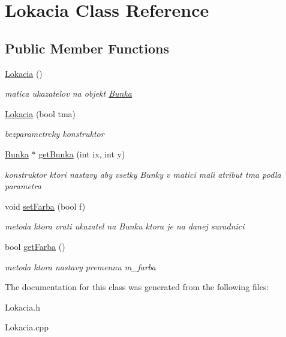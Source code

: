 \hypertarget{class_lokacia}{\section{Lokacia Class Reference}
\label{class_lokacia}
}
\subsection*{Public Member Functions}
\begin{DoxyCompactItemize}
\item 
\hypertarget{class_lokacia_a771d3fb6735a5c35ae151ab62a3b498e}{\hyperlink{class_lokacia_a771d3fb6735a5c35ae151ab62a3b498e}{Lokacia} ()}\label{class_lokacia_a771d3fb6735a5c35ae151ab62a3b498e}

\begin{DoxyCompactList}\small\item\em matica ukazatelov na objekt \hyperlink{class_bunka}{Bunka} \end{DoxyCompactList}\item 
\hypertarget{class_lokacia_ae866508f0db869cb14caf73a051215c3}{\hyperlink{class_lokacia_ae866508f0db869cb14caf73a051215c3}{Lokacia} (bool tma)}\label{class_lokacia_ae866508f0db869cb14caf73a051215c3}

\begin{DoxyCompactList}\small\item\em bezparametrcky konstruktor \end{DoxyCompactList}\item 
\hypertarget{class_lokacia_ac0adf470841e073ef1daa5b918e4c47a}{\hyperlink{class_bunka}{Bunka} $\ast$ \hyperlink{class_lokacia_ac0adf470841e073ef1daa5b918e4c47a}{get\-Bunka} (int ix, int y)}\label{class_lokacia_ac0adf470841e073ef1daa5b918e4c47a}

\begin{DoxyCompactList}\small\item\em konstruktor ktori nastavy aby vsetky Bunky v matici mali atribut tma podla parametra \end{DoxyCompactList}\item 
\hypertarget{class_lokacia_a33a3e3a3c7227f50beea35b3e428f3a5}{void \hyperlink{class_lokacia_a33a3e3a3c7227f50beea35b3e428f3a5}{set\-Farba} (bool f)}\label{class_lokacia_a33a3e3a3c7227f50beea35b3e428f3a5}

\begin{DoxyCompactList}\small\item\em metoda ktora vrati ukazatel na Bunku ktora je na danej suradnici \end{DoxyCompactList}\item 
\hypertarget{class_lokacia_ade8a1d93fd4f0a7d0137498fb0eb7e9b}{bool \hyperlink{class_lokacia_ade8a1d93fd4f0a7d0137498fb0eb7e9b}{get\-Farba} ()}\label{class_lokacia_ade8a1d93fd4f0a7d0137498fb0eb7e9b}

\begin{DoxyCompactList}\small\item\em metoda ktora nastavy premennu m\-\_\-farba \end{DoxyCompactList}\end{DoxyCompactItemize}


The documentation for this class was generated from the following files\-:\begin{DoxyCompactItemize}
\item 
Lokacia.\-h\item 
Lokacia.\-cpp\end{DoxyCompactItemize}
